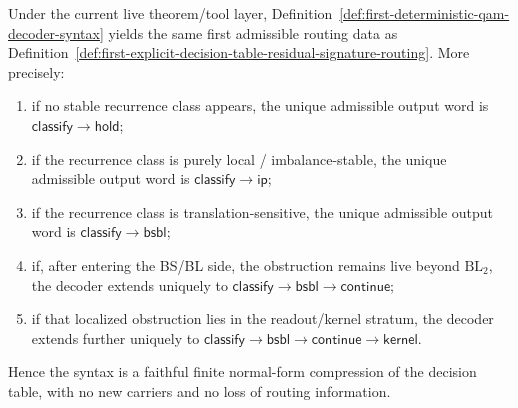 \begin{proposition}
\label{prop:deterministic-decoder-syntax-equivalent-current-decision-table}
Under the current live theorem/tool layer, Definition~\ref{def:first-deterministic-qam-decoder-syntax} yields the same first admissible routing data as Definition~\ref{def:first-explicit-decision-table-residual-signature-routing}. More precisely:
\begin{enumerate}[label=(\roman*)]
    \item if no stable recurrence class appears, the unique admissible output word is \(\mathsf{classify}\to\mathsf{hold}\);
    \item if the recurrence class is purely local / imbalance-stable, the unique admissible output word is \(\mathsf{classify}\to\mathsf{ip}\);
    \item if the recurrence class is translation-sensitive, the unique admissible output word is \(\mathsf{classify}\to\mathsf{bsbl}\);
    \item if, after entering the BS/BL side, the obstruction remains live beyond \(\mathrm{BL}_2\), the decoder extends uniquely to \(\mathsf{classify}\to\mathsf{bsbl}\to\mathsf{continue}\);
    \item if that localized obstruction lies in the readout/kernel stratum, the decoder extends further uniquely to \(\mathsf{classify}\to\mathsf{bsbl}\to\mathsf{continue}\to\mathsf{kernel}\).
\end{enumerate}
Hence the syntax is a faithful finite normal-form compression of the decision table, with no new carriers and no loss of routing information.
\end{proposition}

